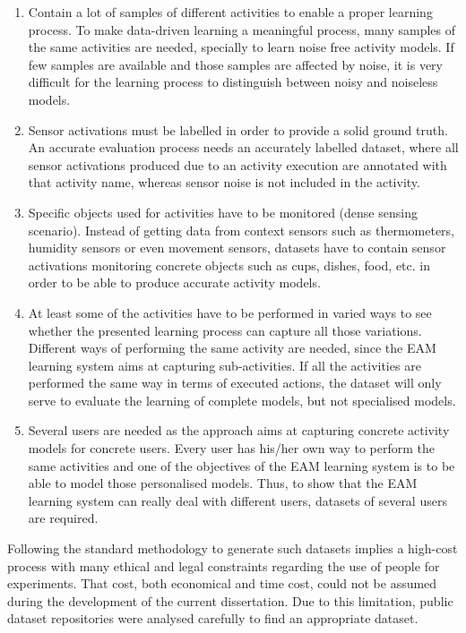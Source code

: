 \begin{enumerate}
 \item Contain a lot of samples of different activities to enable a proper learning process. To make data-driven learning a meaningful process, many samples of the same activities are needed, specially to learn noise free activity models. If few samples are available and those samples are affected by noise, it is very difficult for the learning process to distinguish between noisy and noiseless models.
 \item Sensor activations must be labelled in order to provide a solid ground truth. An accurate evaluation process needs an accurately labelled dataset, where all sensor activations produced due to an activity execution are annotated with that activity name, whereas sensor noise is not included in the activity.
 \item Specific objects used for activities have to be monitored (dense sensing scenario). Instead of getting data from context sensors such as thermometers, humidity sensors or even movement sensors, datasets have to contain sensor activations monitoring concrete objects such as cups, dishes, food, etc. in order to be able to produce accurate activity models.
 \item At least some of the activities have to be performed in varied ways to see whether the presented learning process can capture all those variations. Different ways of performing the same activity are needed, since the EAM learning system aims at capturing sub-activities. If all the activities are performed the same way in terms of executed actions, the dataset will only serve to evaluate the learning of complete models, but not specialised models.
 \item Several users are needed as the approach aims at capturing concrete activity models for concrete users. Every user has his/her own way to perform the same activities and one of the objectives of the EAM learning system is to be able to model those personalised models. Thus, to show that the EAM learning system can really deal with different users, datasets of several users are required.
\end{enumerate}

Following the standard methodology to generate such datasets implies a high-cost process with many ethical and legal constraints regarding the use of people for experiments. That cost, both economical and time cost, could not be assumed during the development of the current dissertation. Due to this limitation, public dataset repositories were analysed carefully to find an appropriate dataset.

